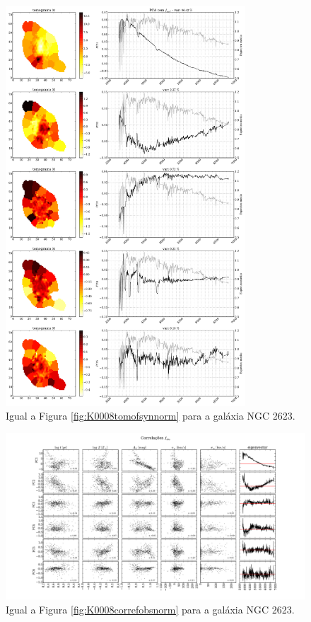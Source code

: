 \begin{figure}
    \includegraphics[width=0.8\textwidth]{figuras/K0213-tomo-syn-norm.pdf}
    \caption[Tomogramas de 1 a 5 para o cubo $f_{syn}$ - NGC 2623.]
    {Igual a Figura \ref{fig:K0008tomofsynnorm} para a galáxia NGC 2623.}
    \label{fig:K0213tomofsynnorm}
\end{figure}

\begin{figure}
    \includegraphics[width=1.3\textwidth, angle=-90]{figuras/K0213-correl-f_obs_norm-PCvsPhys.pdf}
	\caption[Correlações PCs vs. par\^ametros f\'isicos - $f_{obs}$ - NGC 2623.]
	{Igual a Figura \ref{fig:K0008correfobsnorm} para a galáxia NGC 2623.}
    \label{fig:K0213correfobsnorm}
\end{figure}

